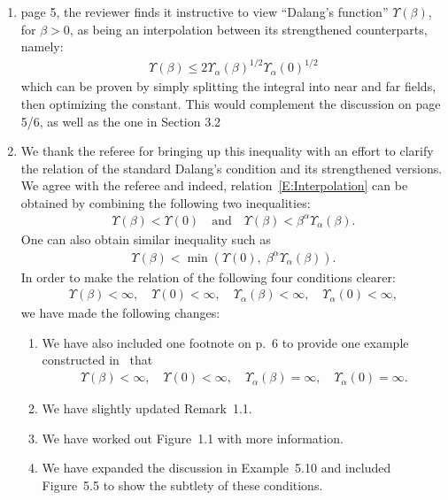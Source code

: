 \documentclass[12pt]{article} %
\theoremstyle{plain}
\theoremstyle{definition}
\numberwithin{equation}{section}
\begin{document}
\begin{enumerate}[(1)]
  \item[2.] page 5, the reviewer finds it instructive to view “Dalang’s
    function” $\Upsilon(\beta)$, for $\beta>0$, as being an interpolation
    between its strengthened counterparts, namely:
    \begin{align}\label{E:Interpolation}
      \Upsilon\left(\beta\right) \le 2 \Upsilon_\alpha(\beta)^{1/2} \Upsilon_\alpha(0)^{1/2}
    \end{align}
    which can be proven by simply splitting the integral into near and far
    fields, then optimizing the constant. This would complement the discussion
    on page 5/6, as well as the one in Section 3.2
  \item[A:] We thank the referee for bringing up this inequality with an effort
    to clarify the relation of the standard Dalang's condition and its
    strengthened versions. We agree with the referee and indeed,
    relation~\eqref{E:Interpolation} can be obtained by combining the following
    two inequalities:
    \begin{align*}
      \Upsilon\left(\beta\right) < \Upsilon\left(0\right)  \quad \text{and} \quad
      \Upsilon\left(\beta\right) < \beta^\alpha \Upsilon_\alpha\left(\beta\right).
    \end{align*}
    One can also obtain similar inequality such as
    \begin{align*}
      \Upsilon(\beta) < \min\left(\Upsilon\left(0\right),\; \beta^\alpha \Upsilon_\alpha\left(\beta\right)\right).
    \end{align*}
    In order to make the relation of the following four conditions clearer:
    \begin{align*}
      \Upsilon(\beta)<\infty, \quad
      \Upsilon(0)<\infty, \quad
      \Upsilon_\alpha(\beta)<\infty, \quad
      \Upsilon_\alpha(0)<\infty,
    \end{align*}
    we have made the following changes:
    \begin{enumerate}
      \item We have also included one footnote on p.~6 to provide one example constructed
        in~\cite{chen.huang.ea:19:dense} that
        \begin{align*}
          \Upsilon(\beta)<\infty, \quad
          \Upsilon(0)<\infty, \quad
          \Upsilon_\alpha(\beta)=\infty, \quad
          \Upsilon_\alpha(0)=\infty.
        \end{align*}
      \item We have slightly updated Remark~1.1.
      \item We have worked out Figure~1.1 with more information.
      \item We have expanded the discussion in Example~5.10 and included
        Figure~5.5 to show the subtlety of these conditions.
    \end{enumerate}


\end{enumerate}
\end{document}
